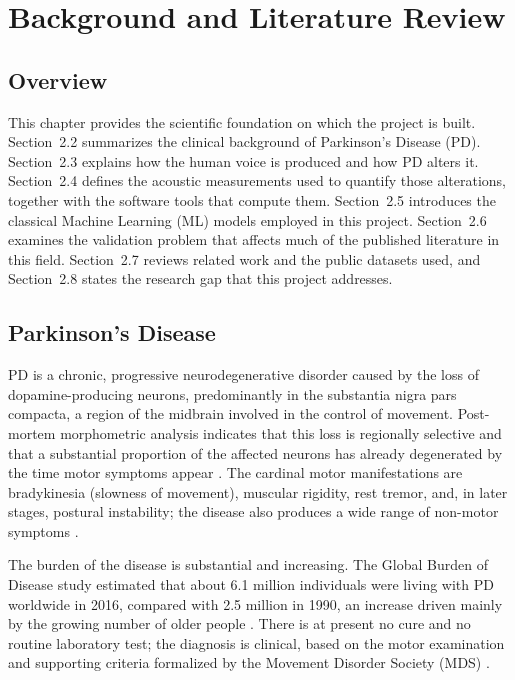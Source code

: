\chapter{Background and Literature Review}

\section{Overview}

This chapter provides the scientific foundation on which the project is
built. Section~2.2 summarizes the clinical background of Parkinson's
Disease (PD). Section~2.3 explains how the human voice is produced and
how PD alters it. Section~2.4 defines the acoustic measurements used to
quantify those alterations, together with the software tools that
compute them. Section~2.5 introduces the classical Machine Learning (ML)
models employed in this project. Section~2.6 examines the validation
problem that affects much of the published literature in this field.
Section~2.7 reviews related work and the public datasets used, and
Section~2.8 states the research gap that this project addresses.

\section{Parkinson's Disease}

PD is a chronic, progressive neurodegenerative disorder caused by the
loss of dopamine-producing neurons, predominantly in the substantia
nigra pars compacta, a region of the midbrain involved in the control of
movement. Post-mortem morphometric analysis indicates that this loss is
regionally selective and that a substantial proportion of the affected
neurons has already degenerated by the time motor symptoms appear
\cite{fearnley1991}. The cardinal motor manifestations are bradykinesia
(slowness of movement), muscular rigidity, rest tremor, and, in later
stages, postural instability; the disease also produces a wide range of
non-motor symptoms \cite{postuma2015}.

The burden of the disease is substantial and increasing. The Global
Burden of Disease study estimated that about 6.1 million individuals
were living with PD worldwide in 2016, compared with 2.5 million in
1990, an increase driven mainly by the growing number of older people
\cite{gbd2018}. There is at present no cure and no routine laboratory
test; the diagnosis is clinical, based on the motor examination and
supporting criteria formalized by the Movement Disorder Society (MDS)
\cite{postuma2015}.

